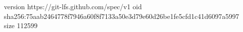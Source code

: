 version https://git-lfs.github.com/spec/v1
oid sha256:75aab2464778f7946a60f8f7133a50e3d79e60d26be1fe5cfd1c41d6097a5997
size 112599
